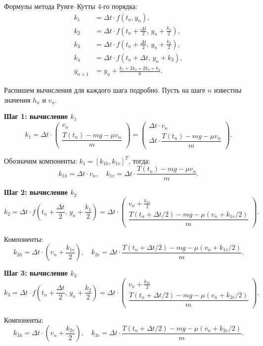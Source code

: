 \documentclass[a4paper, 14pt]{extarticle}
\begin{document}
Формулы метода Рунге--Кутты 4-го порядка:
\[
\begin{aligned}
k_1 &= \Delta t \cdot f(t_n, y_n),\\
k_2 &= \Delta t \cdot f\!\left(t_n+\frac{\Delta t}{2},\, y_n+\frac{k_1}{2}\right),\\
k_3 &= \Delta t \cdot f\!\left(t_n+\frac{\Delta t}{2},\, y_n+\frac{k_2}{2}\right),\\
k_4 &= \Delta t \cdot f(t_n+\Delta t,\, y_n+k_3),\\
y_{n+1} &= y_n+\frac{k_1+2k_2+2k_3+k_4}{6}.
\end{aligned}
\]

Распишем вычисления для каждого шага подробно. Пусть на шаге $n$ известны значения $h_n$ и $v_n$.

\textbf{Шаг 1: вычисление $k_1$}
\[
k_1 = \Delta t \cdot \begin{pmatrix} v_n \\ \dfrac{T(t_n) - mg - \mu v_n}{m} \end{pmatrix} = \begin{pmatrix} \Delta t \cdot v_n \\ \Delta t \cdot \dfrac{T(t_n) - mg - \mu v_n}{m} \end{pmatrix}.
\]

Обозначим компоненты: $k_1 = [k_{1h}, k_{1v}]^T$, тогда:
\[
k_{1h} = \Delta t \cdot v_n, \quad k_{1v} = \Delta t \cdot \frac{T(t_n) - mg - \mu v_n}{m}.
\]

\textbf{Шаг 2: вычисление $k_2$}
\[
k_2 = \Delta t \cdot f\!\left(t_n+\frac{\Delta t}{2},\, y_n+\frac{k_1}{2}\right) = \Delta t \cdot \begin{pmatrix} v_n + \frac{k_{1v}}{2} \\ \dfrac{T(t_n+\Delta t/2) - mg - \mu(v_n + k_{1v}/2)}{m} \end{pmatrix}.
\]

Компоненты:
\[
k_{2h} = \Delta t \cdot \left(v_n + \frac{k_{1v}}{2}\right), \quad k_{2v} = \Delta t \cdot \frac{T(t_n+\Delta t/2) - mg - \mu(v_n + k_{1v}/2)}{m}.
\]

\textbf{Шаг 3: вычисление $k_3$}
\[
k_3 = \Delta t \cdot f\!\left(t_n+\frac{\Delta t}{2},\, y_n+\frac{k_2}{2}\right) = \Delta t \cdot \begin{pmatrix} v_n + \frac{k_{2v}}{2} \\ \dfrac{T(t_n+\Delta t/2) - mg - \mu(v_n + k_{2v}/2)}{m} \end{pmatrix}.
\]

Компоненты:
\[
k_{3h} = \Delta t \cdot \left(v_n + \frac{k_{2v}}{2}\right), \quad k_{3v} = \Delta t \cdot \frac{T(t_n+\Delta t/2) - mg - \mu(v_n + k_{2v}/2)}{m}.
\]
\end{document}
